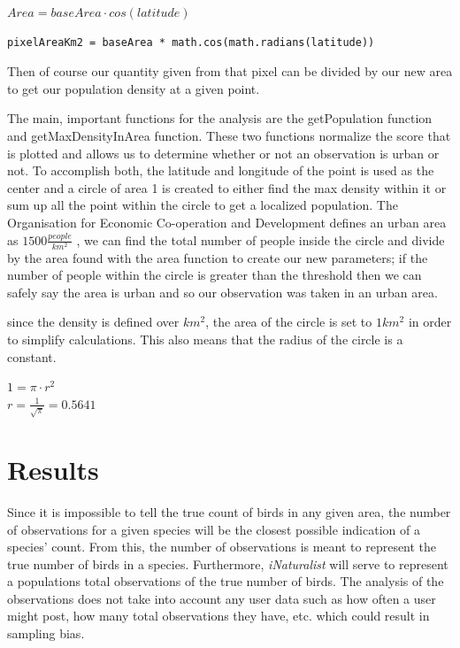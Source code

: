 \documentclass{article}
\begin{document}
\begin{center}
$Area = baseArea \cdot cos(latitude)$
\end{center}

\begin{verbatim}
pixelAreaKm2 = baseArea * math.cos(math.radians(latitude))
\end{verbatim}

Then of course our quantity given from that pixel can be divided by our new area to get our population density at a given point.

The main, important functions for the analysis are the getPopulation function and getMaxDensityInArea function. These two functions normalize the score that is plotted and allows us to determine whether or not an observation is urban or not. To accomplish both, the latitude and longitude of the point is used as the center and a circle of area 1 is created to either find the max density within it or sum up all the point within the circle to get a localized population. The Organisation for Economic Co-operation and Development\cite{OECD} defines an urban area as $1500 \frac{people}{km^2}$ , we can find the total number of people inside the circle and divide by the area found with the area function to create our new parameters; if the number of people within the circle is greater than the threshold then we can safely say the area is urban and so our observation was taken in an urban area.

since the density is defined over $km^2$, the area of the circle is set to $1km^2$ in order to simplify calculations. This also means that the radius of the circle is a constant.

\begin{center}
$ 1 = \pi \cdot r^2$\\
$ r = \frac{1}{\sqrt{\pi}} = 0.5641 $
\end{center}

\section{Results}

Since it is impossible to tell the true count of birds in any given area, the number of observations for a given species will be the closest possible indication of a species' count. From this, the number of observations is meant to represent the true number of birds in a species. Furthermore, \textit{iNaturalist} will serve to represent a populations total observations of the true number of birds. The analysis of the observations does not take into account any user data such as how often a user might post, how many total observations they have, etc. which could result in sampling bias.
\end{document}
